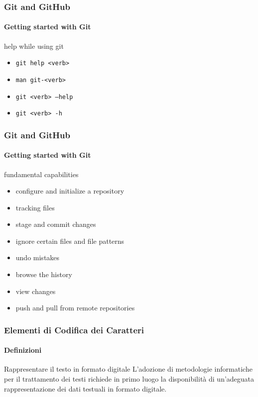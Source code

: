 \begin{frame}
    \frametitle{Git and GitHub}
    \framesubtitle{Getting started with Git}
    \addtocounter{nframe}{1}
	
	\begin{block}{help while using git}
		\begin{itemize}
			\item \texttt{git help <verb>}
			\item \texttt{man git-<verb>}
			\item \texttt{git <verb> --help}
			\item \texttt{git <verb> -h}
		\end{itemize}
    \end{block}

\end{frame}


\begin{frame}
    \frametitle{Git and GitHub}
    \framesubtitle{Getting started with Git}
    \addtocounter{nframe}{1}
	
	\begin{block}{fundamental capabilities}
		\begin{itemize}
			\item configure and initialize a repository
			\item tracking files
			\item stage and commit changes
			\item ignore certain files and file patterns
			\item undo mistakes
			\item browse the history
			\item view changes
			\item push and pull from remote repositories
		\end{itemize}
    \end{block}

\end{frame}



\begin{frame}
	\frametitle{Elementi di Codifica dei Caratteri}
	\framesubtitle{Definizioni}
	\addtocounter{nframe}{1}

	\begin{block}{Rappresentare il testo in formato digitale}
		L’adozione di metodologie informatiche per il trattamento dei testi richiede in primo luogo la disponibilità di un'adeguata rappresentazione dei dati testuali in formato digitale.
	\end{block}

\end{frame}

